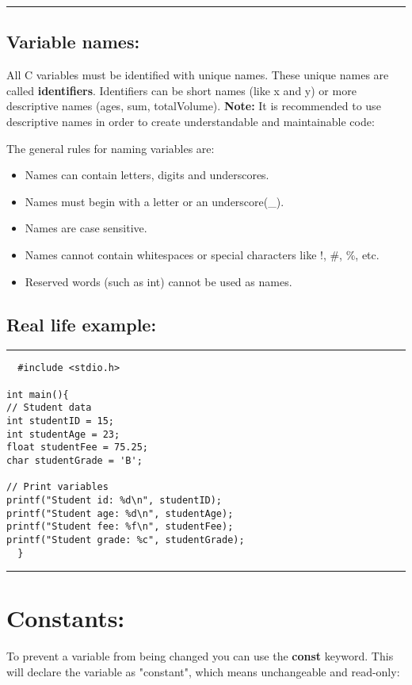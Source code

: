 \documentclass[a4paper]{article}
\begin{document}
\noindent\rule{\textwidth}{0.5pt}

\subsection{Variable names:}
\label{sec:orge137dae}
All C variables must be identified with unique names.
These unique names are called \textbf{identifiers}.
Identifiers can be short names (like x and y) or more descriptive names (ages,
sum, totalVolume).
\textbf{Note:} It is recommended to use descriptive names in order to create
understandable and maintainable code:

The general rules for naming variables are:
\begin{itemize}
\item Names can contain letters, digits and underscores.
\item Names must begin with a letter or an underscore(\_).
\item Names are case sensitive.
\item Names cannot contain whitespaces or special characters like !, \#, \%, etc.
\item Reserved words (such as int) cannot be used as names.
\end{itemize}

\subsection{Real life example:}
\label{sec:orga981c7d}
\noindent\rule{\textwidth}{0.5pt}
\begin{verbatim}
  #include <stdio.h>

int main(){
// Student data
int studentID = 15;
int studentAge = 23;
float studentFee = 75.25;
char studentGrade = 'B';

// Print variables
printf("Student id: %d\n", studentID);
printf("Student age: %d\n", studentAge);
printf("Student fee: %f\n", studentFee);
printf("Student grade: %c", studentGrade);
  }
\end{verbatim}

\noindent\rule{\textwidth}{0.5pt}
\clearpage
\section{Constants:}
\label{sec:org860983d}
To prevent a variable from being changed you can use the \textbf{const} keyword.
This will declare the variable as "constant", which means unchangeable and
read-only:
\end{document}
